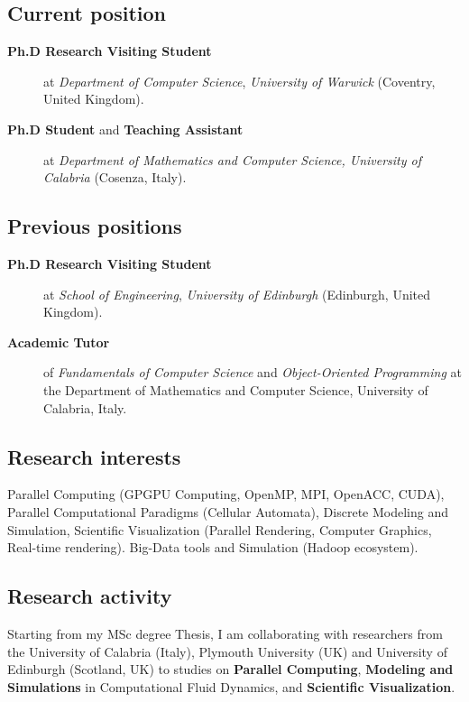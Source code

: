 \documentclass[a4paper,10pt]{article}
\begin{document}
 
\subsection{Current position}
\begin{description}
 
 \item [\textbf{Ph.D Research Visiting Student}] at  
 \textit{Department of Computer Science}, \textit{University of Warwick} (Coventry, United Kingdom).
 
 \item [\textbf{Ph.D Student} and \textbf{Teaching Assistant}] at
  \textit{Department of Mathematics and Computer Science, University of Calabria} (Cosenza, Italy).
\end{description}

\subsection{Previous positions}
\begin{description}
 \item [\textbf{Ph.D Research Visiting Student}] at \textit{School of
  Engineering}, \textit{University of Edinburgh} (Edinburgh, United Kingdom).
  
\item [\textbf{Academic Tutor}] of \textit{Fundamentals of Computer Science} and
 \textit{Object-Oriented Programming} at the Department of Mathematics and
Computer Science, University of Calabria, Italy.
\end{description}

\subsection{Research interests}
Parallel Computing (GPGPU Computing, OpenMP, MPI, OpenACC, CUDA),
Parallel Computational Paradigms (Cellular Automata), Discrete Modeling and
Simulation, Scientific Visualization (Parallel Rendering, Computer Graphics,
Real-time rendering). Big-Data tools and Simulation (Hadoop ecosystem). 

\subsection{Research activity}
Starting from my MSc degree Thesis, I am collaborating with researchers from the
University of Calabria (Italy), Plymouth University (UK) and University of
Edinburgh (Scotland, UK) to studies on \textbf{Parallel Computing},
\textbf{Modeling and Simulations} in Computational Fluid Dynamics, and
\textbf{Scientific Visualization}.
\end{document}
